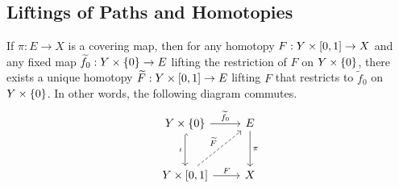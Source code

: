 \documentclass[../Moduli_Spaces_of_Riemann_Surfaces.tex]{subfiles}
\begin{document}
    \subsection{Liftings of Paths and Homotopies}
    \begin{proposition}
        If $\pi:E\to X$ is a covering map, then for any homotopy $F:Y\times\left[0,1\right]\to X$ and any fixed map $\widetilde{f}_0:Y\times\left\{0\right\}\to E$ lifting the restriction of $F$ on $Y\times\left\{0\right\}$, there exists a unique homotopy $\widetilde{F}:Y\times\left[0,1\right]\to E$ lifting $F$ that restricts to $\widetilde{f}_0$ on $Y\times\left\{0\right\}$. In other words, the following diagram commutes.
        \vspace{-0.05in}
        \begin{equation*}
            \begin{tikzcd}[row sep=0.4in]
                Y\times\l\{0\r\} \ar[r, "\widetilde{f}_0"] \ar[d, "\iota"', hookrightarrow] & E \ar[d, "\pi"] \\
                Y\times\l[0,1\r] \ar[r, "F"] \ar[ur, "\widetilde{F}", dashed] & X
            \end{tikzcd}
        \end{equation*}
    \end{proposition}
\end{document}
